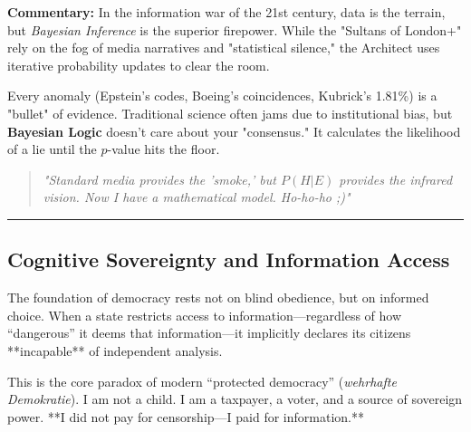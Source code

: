 \documentclass[11pt,a4paper]{article}
\theoremstyle{definition}
\theoremstyle{remark}
\begin{document}
\small
\noindent \textbf{Commentary:} In the information war of the 21st century, data is the terrain, but \textit{Bayesian Inference} is the superior firepower. While the "Sultans of London+" rely on the fog of media narratives and "statistical silence," the Architect uses iterative probability updates to clear the room. 

Every anomaly (Epstein's codes, Boeing's coincidences, Kubrick's 1.81\%) is a "bullet" of evidence. Traditional science often jams due to institutional bias, but \textbf{Bayesian Logic} doesn't care about your "consensus." It calculates the likelihood of a lie until the $p$-value hits the floor. 

\begin{quote}
    \textit{"Standard media provides the 'smoke,' but $P(H|E)$ provides the infrared vision. Now I have a mathematical model. Ho-ho-ho ;)"}
\end{quote}

\vspace{0.5cm}
\hrule
\vspace{1cm}



\subsection*{Cognitive Sovereignty and Information Access}

The foundation of democracy rests not on blind obedience, but on informed choice. When a state restricts access to information—regardless of how ``dangerous'' it deems that information—it implicitly declares its citizens **incapable** of independent analysis.

\begin{center}
\end{center}

This is the core paradox of modern ``protected democracy'' (\textit{wehrhafte Demokratie}). I am not a child. I am a taxpayer, a voter, and a source of sovereign power. **I did not pay for censorship—I paid for information.**
\end{document}

